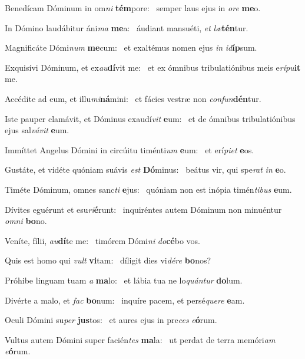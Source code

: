 \item Benedícam Dóminum in om\textit{ni} \textbf{tém}pore:~\psstar{} semper laus ejus in \textit{ore} \textbf{me}o.
\item In Dómino laudábitur áni\textit{ma} \textbf{me}a:~\psstar{} áudiant mansuéti, \textit{et} \textit{læ}\textbf{tén}tur.
\item Magnificáte Dómi\textit{num} \textbf{me}\-cum:~\psstar{} et exaltémus nomen ejus \textit{in} \textit{id}\textbf{íp}sum.
\item Exquisívi Dóminum, et ex\textit{au}\textbf{dí}vit me:~\psstar{} et ex ómnibus tribulatiónibus meis e\textit{rípu}\textbf{it} me.
\item Accédite ad eum, et illu\textit{mi}\textbf{ná}mini:~\psstar{} et fácies vestræ non \textit{confun}\textbf{dén}tur.
\item Iste pauper clamávit, et Dóminus exaudí\textit{vit} \textbf{e}um:~\psstar{} et de ómnibus tribulatiónibus ejus sal\textit{vávit} \textbf{e}um.
\item Immíttet Angelus Dómini in circúitu timénti\textit{um} \textbf{e}um:~\psstar{} et erí\textit{piet} \textbf{e}os.
\item Gustáte, et vidéte quóniam suávis \textit{est} \textbf{Dó}minus:~\psstar{} beátus vir, qui spe\textit{rat} \textit{in} \textbf{e}o.
\item Timéte Dóminum, omnes sanc\textit{ti} \textbf{e}jus:~\psstar{} quóniam non est inópia timén\textit{tibus} \textbf{e}um.
\item Dívites eguérunt et esu\textit{ri}\textbf{é}\-runt:~\psstar{} inquiréntes autem Dóminum non minuéntur \textit{omni} \textbf{bo}no.
\item Veníte, fílii, \textit{au}\textbf{dí}te me:~\psstar{} timórem Dómi\textit{ni} \textit{do}\textbf{cé}bo vos.
\item Quis est homo qui \textit{vult} \textbf{vi}tam:~\psstar{} díligit dies vi\textit{dére} \textbf{bo}nos?
\item Próhibe linguam tuam \textit{a} \textbf{ma}lo:~\psstar{} et lábia tua ne lo\textit{quántur} \textbf{do}lum.
\item Divérte a malo, et \textit{fac} \textbf{bo}num:~\psstar{} inquíre pacem, et persé\textit{quere} \textbf{e}am.
\item Oculi Dómini su\textit{per} \textbf{jus}tos:~\psstar{} et aures ejus in pre\textit{ces} \textit{e}\textbf{ó}rum.
\item Vultus autem Dómini super facién\textit{tes} \textbf{ma}la:~\psstar{} ut perdat de terra memóri\textit{am} \textit{e}\textbf{ó}rum.
